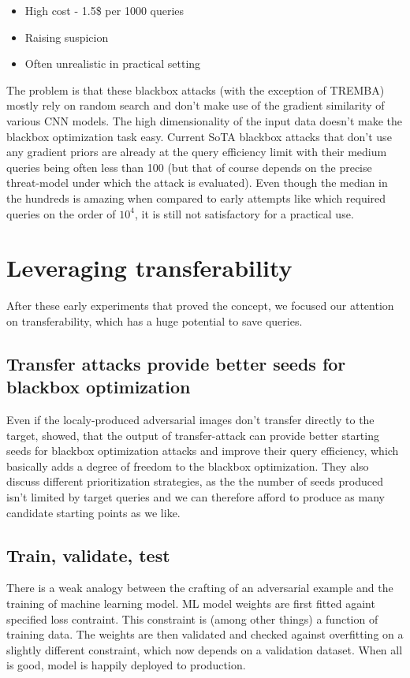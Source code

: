 \begin{itemize}
    \item{High cost - 1.5\$ per 1000 queries}
    \item{Raising suspicion}
    \item{Often unrealistic in practical setting}
\end{itemize}


The problem is that these blackbox attacks (with the exception of TREMBA) mostly rely on random search and don't make use of the gradient similarity of various CNN models. The high dimensionality of the input data doesn't make the blackbox optimization task easy. Current SoTA blackbox attacks that don't use any gradient priors are already at the query efficiency limit with their medium queries being often less than 100 (but that of course depends on the precise threat-model under which the attack is evaluated). Even though the median in the hundreds is amazing when compared to early attempts like \cite{Chen2017ZOOZO} which required queries on the order of $10^4$, it is still not satisfactory for a practical use. 


\section{Leveraging transferability}
\label{Leveraging_transferability}
After these early experiments that proved the concept, we focused our attention on transferability, which has a huge potential to save queries.

\subsection{Transfer attacks provide better seeds for blackbox optimization}
\label{transfer_attack_seeds}
Even if the localy-produced adversarial images don't transfer directly to the target, \cite{Suya2020HybridBA} showed, that the output of transfer-attack can provide better starting seeds for blackbox optimization attacks and improve their query efficiency, which basically adds a degree of freedom to the blackbox optimization. They also discuss different prioritization strategies, as the the number of seeds produced isn't limited by target queries and we can therefore afford to produce as many candidate starting points as we like.

\subsection{Train, validate, test}
There is a weak analogy between the crafting of an adversarial example and the training of machine learning model. ML model weights are first fitted againt specified loss contraint. This constraint is (among other things) a function of training data. The weights are then validated and checked against overfitting on a slightly different constraint, which now depends on a validation dataset. When all is good, model is happily deployed to production.

